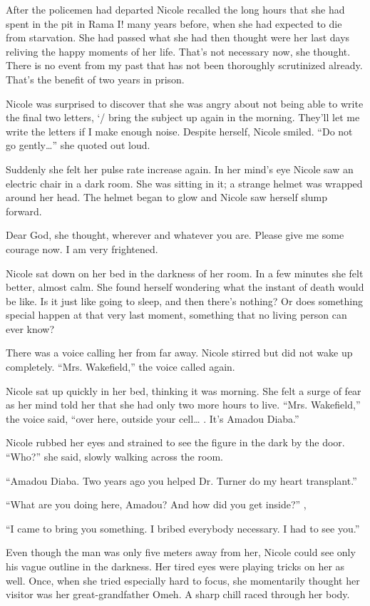\documentclass[]{article}
\begin{document}
{{After the policemen had departed Nicole recalled the long hours that she had spent in the pit in Rama I! many years before, when she had expected to die from starvation.  She had passed what she had then thought were her last days reliving the happy moments of her life.  That’s not necessary now, she thought.  There is no event from my past that has not been thoroughly scrutinized already.  That’s the benefit of two years in prison.

Nicole was surprised to discover that she was angry about not being able to write the final two letters, ‘/ bring the subject up again in the morning.  They’ll let me write the letters if I make enough noise.  Despite herself, Nicole smiled.  “Do not go gently…” she quoted out loud.

Suddenly she felt her pulse rate increase again.  In her mind’s eye Nicole saw an electric chair in a dark room.  She was sitting in it; a strange helmet was wrapped around her head.  The helmet began to glow and Nicole saw herself slump forward.

Dear God, she thought, wherever and whatever you are.  Please give me some courage now.  I am very frightened.

Nicole sat down on her bed in the darkness of her room.  In a few minutes she felt better, almost calm.  She found herself wondering what the instant of death would be like.  Is it just like going to sleep, and then there’s nothing? Or does something special happen at that very last moment, something that no living person can ever know?

There was a voice calling her from far away.  Nicole stirred but did not wake up completely.  “Mrs.  Wakefield,” the voice called again.

Nicole sat up quickly in her bed, thinking it was morning.  She felt a surge of fear as her mind told her that she had only two more hours to live.  “Mrs.  Wakefield,” the voice said, “over here, outside your cell… .  It’s Amadou Diaba.”

Nicole rubbed her eyes and strained to see the figure in the dark by the door.  “Who?” she said, slowly walking across the room.

“Amadou Diaba.  Two years ago you helped Dr.  Turner do my heart transplant.”

“What are you doing here, Amadou? And how did you get inside?” ,

“I came to bring you something.  I bribed everybody necessary.  I had to see you.”

Even though the man was only five meters away from her, Nicole could see only his vague outline in the darkness.  Her tired eyes were playing tricks on her as well.  Once, when she tried especially hard to focus, she momentarily thought her visitor was her great-grandfather Omeh.  A sharp chill raced through her body.

}}
\end{document}
